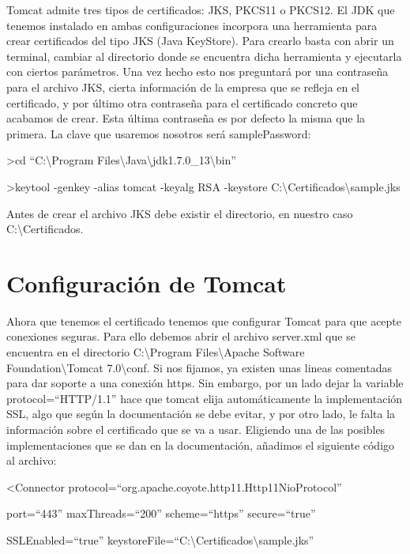 \documentclass[a4paper]{article}
\begin{document}
Tomcat admite tres tipos de certificados: JKS, PKCS11 o PKCS12. El JDK que tenemos instalado en ambas configuraciones incorpora una herramienta para crear certificados del tipo JKS (Java KeyStore). Para crearlo basta con abrir un terminal, cambiar al directorio donde se encuentra dicha herramienta y ejecutarla con ciertos parámetros. Una vez hecho esto nos preguntará por una contraseña para el archivo JKS, cierta información de la empresa que se refleja en el certificado, y por último otra contraseña para el certificado concreto que acabamos de crear. Esta última contraseña es por defecto la misma que la primera. La clave que usaremos nosotros será samplePassword:

\noindent\colorbox{shadecolor}{\textgreater cd ``C:\textbackslash Program Files\textbackslash Java\textbackslash jdk1.7.0\_13\textbackslash bin''}

\noindent\colorbox{shadecolor}{\textgreater keytool -genkey -alias tomcat -keyalg RSA -keystore C:\textbackslash Certificados\textbackslash sample.jks}

Antes de crear el archivo JKS debe existir el directorio, en nuestro caso C:\textbackslash Certificados.

\section{Configuración de Tomcat}

Ahora que tenemos el certificado tenemos que configurar Tomcat para que acepte conexiones seguras. Para ello debemos abrir el archivo server.xml que se encuentra en el directorio C:\textbackslash Program Files\textbackslash Apache Software Foundation\textbackslash Tomcat 7.0\textbackslash conf. Si nos fijamos, ya existen unas lineas comentadas para dar soporte a una conexión https. Sin embargo, por un lado dejar la variable protocol=``HTTP/1.1'' hace que tomcat elija automáticamente la implementación SSL, algo que según la documentación se debe evitar, y por otro lado, le falta la información sobre el certificado que se va a usar. Eligiendo una de las posibles implementaciones que se dan en la documentación, añadimos el siguiente código al archivo:

\noindent\colorbox{shadecolor}{\textless Connector protocol=``org.apache.coyote.http11.Http11NioProtocol''}

\noindent\colorbox{shadecolor}{port=``443'' maxThreads=``200'' scheme=``https'' secure=``true''}

\noindent\colorbox{shadecolor}{SSLEnabled=``true'' keystoreFile=``C:\textbackslash Certificados\textbackslash sample.jks''}
\end{document}
